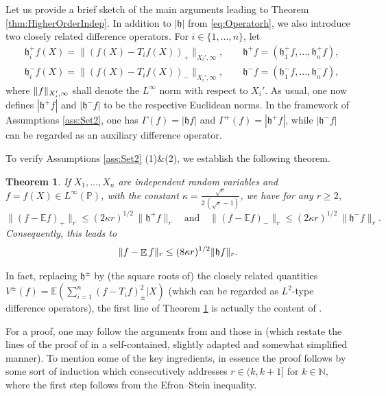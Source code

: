 \documentclass[a4paper,12pt]{amsart}
\numberwithin{equation}{section}
\newtheorem{satz}{Theorem}[section]
\theoremstyle{remark}
\DeclarePairedDelimiter	{\norm}		{\lVert}	{\rVert}
\DeclareMathOperator	{\IE}		{\mathbb{E}}
\def\E{{\mathbb E}}
\def\P{{\mathbb P}}
\def\N{{\mathbb N}}
\begin{document}
Let us provide a brief sketch of the main arguments leading to Theorem \ref{thm:HigherOrderIndep}. In addition to $|\mathfrak{h}|$ from \eqref{eq:Operatorh}, we also introduce two closely related difference operators. For $i \in \{1, \ldots, n\}$, let
\begin{align*} %
	&\mathfrak{h}^+_if(X) = \lVert (f(X) - T_if(X))_+ \rVert_{X_i', \infty},
	\qquad \mathfrak{h}^+f = (\mathfrak{h}^+_1f, \ldots, \mathfrak{h}^+_nf),\\
	&\mathfrak{h}^-_if(X) = \lVert (f(X) - T_if(X))_- \rVert_{X_i', \infty},
	\qquad \mathfrak{h}^-f = (\mathfrak{h}^-_1f, \ldots, \mathfrak{h}^-_nf),
\end{align*}
where $\norm{f}_{X_i',\infty}$ shall denote the $L^\infty$ norm with respect to $X_i'$. As usual, one now defines $|\mathfrak{h}^+ f|$ and $|\mathfrak{h}^- f|$ to be the respective Euclidean norms. In the framework of Assumptions \ref{ass:Set2}, one has $\Gamma (f) = |\mathfrak{h} f|$ and $\Gamma^+ (f) = |\mathfrak{h}^+ f|$, while $|\mathfrak{h}^- f|$ can be regarded as an auxiliary difference operator.

To verify Assumptions \ref{ass:Set2} (1)\&(2), we establish the following theorem.

\begin{satz}\label{th:BBLM}
	If $X_1, \ldots, X_n$ are independent random variables and $f = f(X) \in L^\infty(\P)$, with the constant $\kappa = \frac{\sqrt{e}}{2\,(\sqrt{e} - 1)}$, we have for any $r \ge 2$,
	\begin{equation*} %
		\lVert (f - \mathbb{E}f)_+ \rVert_r \le (2\kappa r)^{1/2}\, \lVert \mathfrak{h}^+f \rVert_r \quad \text{and} \quad
		\lVert (f - \mathbb{E}f)_- \rVert_r \le (2\kappa r)^{1/2}\, \lVert \mathfrak{h}^-f \rVert_r.
	\end{equation*}
	Consequently, this leads to 
	\[
	\norm{f - \IE f}_r \le (8\kappa r)^{1/2} \norm{\mathfrak{h}f}_r.
	\]
\end{satz}

In fact, replacing $\mathfrak{h}^\pm$ by (the square roots of) the closely related quantities $V^\pm(f) = \E(\sum_{i = 1}^n (f-T_if)^2_\pm|X)$ (which can be regarded as $L^2$-type difference operators), the first line of Theorem \ref{th:BBLM} is actually the content of \cite[Th.\ 2]{BBLM05}.

For a proof, one may follow the arguments from \cite{BBLM05} and those in \cite[Sec.\ 2]{BGS19} (which restate the lines of the proof of \cite{BBLM05} in a self-contained, slightly adapted and somewhat simplified manner). To mention some of the key ingredients, in essence the proof follows by some sort of induction which consecutively addresses $r \in (k,k+1]$ for $k \in \N$, where the first step follows from the Efron--Stein inequality.
\end{document}
